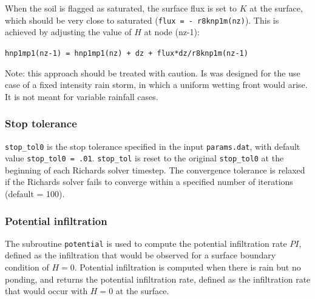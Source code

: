 \documentclass{article}
\newcommand{\code}[1]{\texttt{#1}}
\begin{document}

When the soil is flagged as saturated,  the surface flux is set to $K$ at the surface, which should be very close to saturated (\code{flux  = - r8knp1m(nz)}).  This is achieved by adjusting the value of $H$ at node (nz-1):
\begin{center}
\code{hnp1mp1(nz-1) = hnp1mp1(nz) + dz + flux*dz/r8knp1m(nz-1)}	
\end{center}

Note: this approach should be treated with caution.  Is was designed for the use case of a fixed intensity rain storm, in which a uniform wetting front would arise.  It is not meant for variable rainfall cases.

\subsubsection*{Stop tolerance }
\code{stop\_tol0} is the stop tolerance specified in the input \code{params.dat}, with default value \code{stop\_tol0 = .01}.  
\code{stop\_tol} is reset to the original \code{stop\_tol0}  at the beginning of each Richards solver timestep.  The convergence tolerance  is relaxed if the Richards solver fails to converge within a specified number of iterations (default = 100).

%


\subsubsection*{Potential infiltration}

The subroutine \code{potential} is used to compute the potential infiltration rate $PI$, defined as the infiltration that would be observed for a surface boundary condition of $H=0$. 
Potential infiltration is computed when there is rain but no ponding, and returns the potential infiltration rate, defined as the infiltration rate that would occur with $H=0$ at the surface.  
\end{document}

